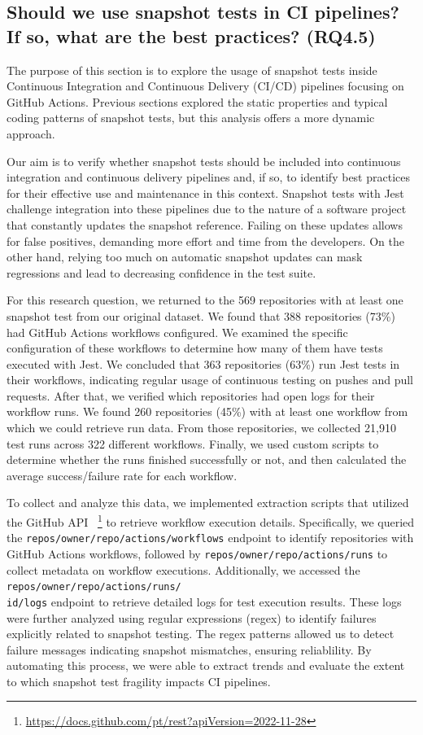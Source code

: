 \documentclass[
	msc, %
	english %
]{../ppgccufmg}
\begin{document}
        \subsection{Should we use snapshot tests in CI pipelines? If so, what are the best practices? (RQ4.5)}
        
        The purpose of this section is to explore the usage of snapshot tests inside Continuous Integration and Continuous Delivery (CI/CD) pipelines focusing on GitHub Actions. Previous sections explored the static properties and typical coding patterns of snapshot tests, but this analysis offers a more dynamic approach.
        
        Our aim is to verify whether snapshot tests should be included into continuous integration and continuous delivery pipelines and, if so, to identify best practices for their effective use and maintenance in this context. Snapshot tests with Jest challenge integration into these pipelines due to the nature of a software project that constantly updates the snapshot reference. Failing on these updates allows for false positives, demanding more effort and time from the developers. On the other hand, relying too much on automatic snapshot updates can mask regressions and lead to decreasing confidence in the test suite.

        For this research question, we returned to the 569 repositories with at least one snapshot test from our original dataset. We found that 388 repositories (73\%) had GitHub Actions workflows configured. We examined the specific configuration of these workflows to determine how many of them have tests executed with Jest. We concluded that 363 repositories (63\%) run Jest tests in their workflows, indicating regular usage of continuous testing on pushes and pull requests. After that, we verified which repositories had open logs for their workflow runs. We found 260 repositories (45\%) with at least one workflow from which we could retrieve run data. From those repositories, we collected 21,910 test runs across 322 different workflows. Finally, we used custom scripts to determine whether the runs finished successfully or not, and then calculated the average success/failure rate for each workflow.

        To collect and analyze this data, we implemented extraction scripts that utilized the GitHub API ~\footnote{\url{https://docs.github.com/pt/rest?apiVersion=2022-11-28}} to retrieve workflow execution details. Specifically, we queried the \texttt{repos/owner/repo/actions/workflows} endpoint to identify repositories with GitHub Actions workflows, followed by \texttt{repos/owner/repo/actions/runs} to collect metadata on workflow executions. Additionally, we accessed the \texttt{repos/owner/repo/actions/runs/\\id/logs} endpoint to retrieve detailed logs for test execution results. These logs were further analyzed using regular expressions (regex) to identify failures explicitly related to snapshot testing. The regex patterns allowed us to detect failure messages indicating snapshot mismatches, ensuring reliablility. By automating this process, we were able to extract trends and evaluate the extent to which snapshot test fragility impacts CI pipelines.
        
\end{document}
